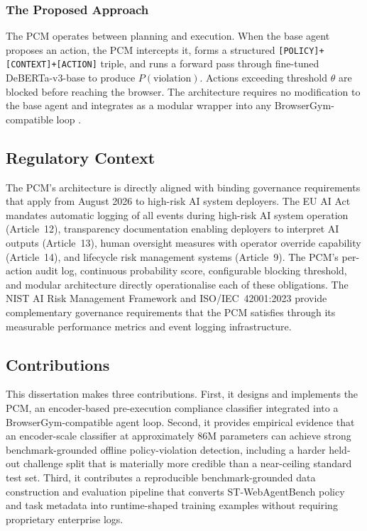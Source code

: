 \documentclass[12pt,a4paper]{article}
\begin{document}
\subsubsection{The Proposed Approach} The PCM operates between planning and execution. When the base agent proposes an action, the PCM intercepts it, forms a structured \texttt{[POLICY]+[CONTEXT]+[ACTION]} triple, and runs a forward pass through fine-tuned DeBERTa-v3-base \citep{he2023debertav3} to produce $P(\text{violation})$. Actions exceeding threshold $\theta$ are blocked before reaching the browser. The architecture requires no modification to the base agent and integrates as a modular wrapper into any BrowserGym-compatible loop \citep{chezelles2025browsergym}. 

\subsection{Regulatory Context}
\label{sec:regulatory}

The PCM's architecture is directly aligned with binding governance requirements
that apply from August 2026 to high-risk AI system deployers. The EU AI Act
\citep{euaiact2024} mandates automatic logging of all events during high-risk AI
system operation (Article~12), transparency documentation enabling deployers to
interpret AI outputs (Article~13), human oversight measures with operator override
capability (Article~14), and lifecycle risk management systems (Article~9). The
PCM's per-action audit log, continuous probability score, configurable blocking
threshold, and modular architecture directly operationalise each of these
obligations. The NIST AI Risk Management Framework \citep{nist2023rmf} and
ISO/IEC~42001:2023 \citep{iso2023} provide complementary governance requirements
that the PCM satisfies through its measurable performance metrics and event
logging infrastructure.

\subsection{Contributions} This dissertation makes three contributions. First, it designs and implements the PCM, an encoder-based pre-execution compliance classifier integrated into a BrowserGym-compatible agent loop. Second, it provides empirical evidence that an encoder-scale classifier at approximately 86M parameters can achieve strong benchmark-grounded offline policy-violation detection, including a harder held-out challenge split that is materially more credible than a near-ceiling standard test set. Third, it contributes a reproducible benchmark-grounded data construction and evaluation pipeline that converts ST-WebAgentBench policy and task metadata into runtime-shaped training examples without requiring proprietary enterprise logs.
\end{document}
